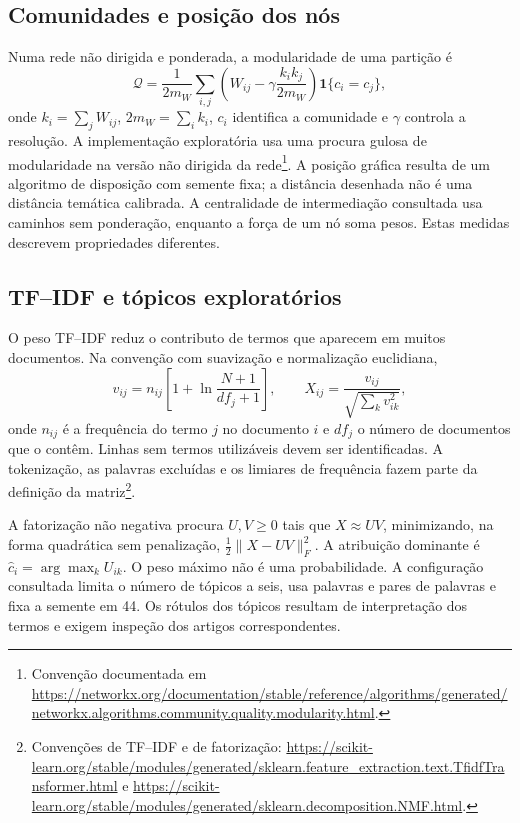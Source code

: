 \subsection{Comunidades e posição dos nós}
\label{sec:mat-modularidade}
Numa rede não dirigida e ponderada, a modularidade de uma partição é
\begin{equation}
\mathcal Q=\frac1{2m_W}\sum_{i,j}
\left(W_{ij}-\gamma\frac{k_i k_j}{2m_W}\right)\mathbf1\{c_i=c_j\},
\label{eq:mat-modularidade}
\end{equation}
onde $k_i=\sum_jW_{ij}$, $2m_W=\sum_ik_i$, $c_i$ identifica a comunidade e $\gamma$ controla a resolução. A implementação exploratória usa uma procura gulosa de modularidade na versão não dirigida da rede\footnote{Convenção documentada em \url{https://networkx.org/documentation/stable/reference/algorithms/generated/networkx.algorithms.community.quality.modularity.html}.}. A posição gráfica resulta de um algoritmo de disposição com semente fixa; a distância desenhada não é uma distância temática calibrada. A centralidade de intermediação consultada usa caminhos sem ponderação, enquanto a força de um nó soma pesos. Estas medidas descrevem propriedades diferentes.

\subsection{TF--IDF e tópicos exploratórios}
\label{sec:mat-topicos}
O peso TF--IDF reduz o contributo de termos que aparecem em muitos documentos. Na convenção com suavização e normalização euclidiana,
\begin{equation}
v_{ij}=n_{ij}\left[1+\ln\frac{N+1}{df_j+1}\right],
\qquad X_{ij}=\frac{v_{ij}}{\sqrt{\sum_kv_{ik}^2}},
\label{eq:mat-tfidf}
\end{equation}
onde $n_{ij}$ é a frequência do termo $j$ no documento $i$ e $df_j$ o número de documentos que o contêm. Linhas sem termos utilizáveis devem ser identificadas. A tokenização, as palavras excluídas e os limiares de frequência fazem parte da definição da matriz\footnote{Convenções de TF--IDF e de fatorização: \url{https://scikit-learn.org/stable/modules/generated/sklearn.feature_extraction.text.TfidfTransformer.html} e \url{https://scikit-learn.org/stable/modules/generated/sklearn.decomposition.NMF.html}.}.

A fatorização não negativa procura $U,V\geq0$ tais que $X\approx UV$, minimizando, na forma quadrática sem penalização, $\tfrac12\|X-UV\|_F^2$. A atribuição dominante é $\widehat c_i=\arg\max_kU_{ik}$. O peso máximo não é uma probabilidade. A configuração consultada limita o número de tópicos a seis, usa palavras e pares de palavras e fixa a semente em 44. Os rótulos dos tópicos resultam de interpretação dos termos e exigem inspeção dos artigos correspondentes.

